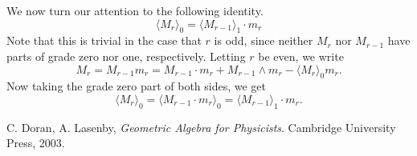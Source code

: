 \documentclass{birkjour}
\theoremstyle{definition}
\theoremstyle{remark}
\numberwithin{equation}{section}
\begin{document}
We now turn our attention to the following identity.
\begin{equation}\label{equ_gr_zero_part_of_Mr}
\langle M_r\rangle_0 = \langle M_{r-1}\rangle_1\cdot m_r
\end{equation}
Note that this is trivial in the case that $r$ is odd, since neither $M_r$ nor $M_{r-1}$ have parts of grade zero nor one, respectively.
Letting $r$ be even, we write
\begin{equation*}
M_r = M_{r-1}m_r = M_{r-1}\cdot m_r + M_{r-1}\wedge m_r - \langle M_r\rangle_0 m_r.
\end{equation*}
Now taking the grade zero part of both sides, we get
\begin{equation*}
\langle M_r\rangle_0 = \langle M_{r-1}\cdot m_r\rangle_0 = \langle M_{r-1}\rangle_1\cdot m_r.
\end{equation*}

\begin{thebibliography}{9}

C. Doran, A. Lasenby, {\it Geometric Algebra for Physicists}. Cambridge University Press, 2003.


\end{thebibliography}
\end{document}
